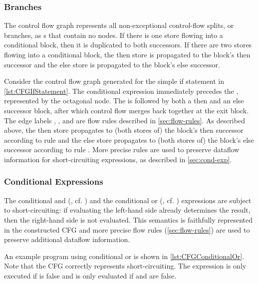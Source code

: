 \subsubsection{Branches}

The control flow graph represents all non-exceptional control-flow
splits, or branches, as s that contain no
nodes.  If there is one store flowing into a conditional block, then
it is duplicated to both successors.  If there are two stores flowing
into a conditional block, the then store is propagated to the block's
then successor and the else store is propagated to the block's else
successor.

Consider the control flow graph generated for the simple if statement
in \autoref{lst:CFGIfStatement}.  The conditional expression 
immediately precedes the , represented by the
octagonal node.  The  is followed by both a
then and an else successor block, after which control flow merges back
together at the exit block.  The edge labels ,
, and  are flow rules described
in \autoref{sec:flow-rules}.  As described above, the then store
propagates to (both stores of) the block's then successor according to
rule  and the else store propagates to (both stores
of) the block's else successor according to rule .
More precise rules are used to preserve dataflow information for
short-circuiting expressions, as described in \autoref{sec:cond-exp}.


\subsubsection{Conditional Expressions}
\label{sec:cond-exp}

The conditional and (\code{&&}, cf. ) and the
conditional or (\code{||}, cf. ) expressions are subject
to short-circuiting: if evaluating the left-hand side already
determines the result, then the right-hand side is not evaluated. This
semantics is faithfully represented in the constructed CFG and more
precise flow rules (\autoref{sec:flow-rules}) are used to preserve
additional dataflow information.

An example program using conditional or is shown in
\autoref{lst:CFGConditionalOr}.  Note that the CFG correctly
represents short-circuiting.  The expression  is only
executed if  is false and  is only evaluated if
 and  are false.

